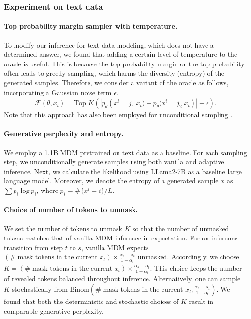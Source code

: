 \subsubsection{Experiment on text data}

\paragraph{Top probability margin sampler with temperature.}
To modify our inference for text data modeling, which does not have a determined answer, we found that adding a certain level of temperature to the oracle is useful. This is because the top probability margin or the top probability often leads to greedy sampling, which harms the diversity (entropy) of the generated samples. Therefore, we consider a variant of the oracle as follows, incorporating a Gaussian noise term $\epsilon$. 
\begin{align*}
    \mathcal{F}(\theta, x_t) = \text{Top } K \left(| p_\theta(x^i = j_1 | x_t) - p_\theta(x^i = j_2 | x_t) | + \epsilon \right).
\end{align*}
Note that this approach has also been employed for unconditional sampling \cite{wang2024diffusion,zheng2024reparameterized}.

\paragraph{Generative perplexity and entropy.} 
We employ a 1.1B MDM pretrained on text data as a baseline. For each sampling step, we unconditionally generate samples using both vanilla and adaptive inference. Next, we calculate the likelihood using LLama2-7B as a baseline large language model. Moreover, we denote the entropy of a generated sample $x$ as  $\sum p_i \log p_i$, where $p_i = \# \{x^i = i \}/L$.

\paragraph{Choice of number of tokens to unmask.} We set the number of tokens to unmask $K$ so that the number of unmasked tokens matches that of vanilla MDM inference in expectation. For an inference transition from step $t$ to $s$, vanilla MDM expects $(\#\text{ mask tokens in the current }x_t)\times\frac{\alpha_s-\alpha_t}{1-\alpha_t}$ unmasked. Accordingly, we choose $K = (\#\text{ mask tokens in the current }x_t)\times\frac{\alpha_s-\alpha_t}{1-\alpha_t}$. This choice keeps the number of revealed tokens balanced throughout inference. Alternatively, one can sample $K$ stochastically from $\mathrm{Binom}(\#\text{ mask tokens in the current }x_t,\frac{\alpha_s-\alpha_t}{1-\alpha_t})$. We found that both the deterministic and stochastic choices of $K$ result in comparable generative perplexity.

